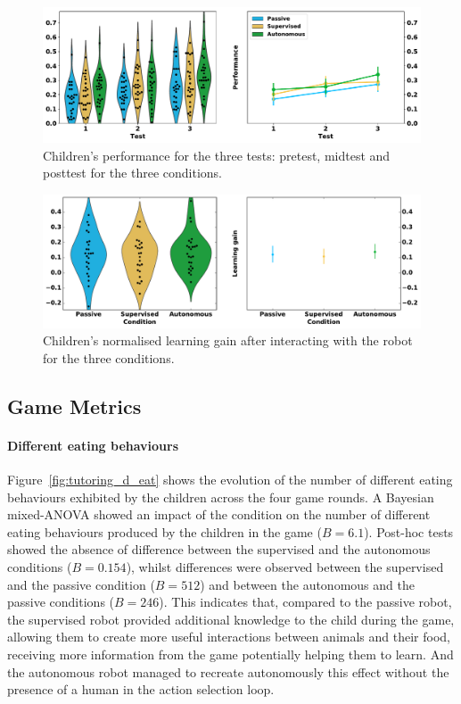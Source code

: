 \begin{figure}[ht]
	\includegraphics[width=1\linewidth]{perf.pdf}
	\centering
	\caption{Children's performance for the three tests: pretest, midtest and posttest for the three conditions.}
	\label{fig:tutoring_performance}
\end{figure}

\begin{figure}[ht]
	\includegraphics[width=1\linewidth]{learning.pdf}
	\centering
	\caption{Children's normalised learning gain after interacting with the robot for the three conditions.}
	\label{fig:tutoring_learning}
\end{figure}

\subsection{Game Metrics}

\paragraph{Different eating behaviours}
Figure~\ref{fig:tutoring_d_eat} shows the evolution of the number of different eating behaviours exhibited by the children across the four game rounds. A Bayesian mixed-ANOVA showed an impact of the condition on the number of different eating behaviours produced by the children in the game ($B=6.1$). Post-hoc tests showed the absence of difference between the supervised and the autonomous conditions ($B=0.154$), whilst differences were observed between the supervised and the passive condition ($B=512$) and between the autonomous and the passive conditions ($B=246$). This indicates that, compared to the passive robot, the supervised robot provided additional knowledge to the child during the game, allowing them to create more useful interactions between animals and their food, receiving more information from the game potentially helping them to learn. And the autonomous robot managed to recreate autonomously this effect without the presence of a human in the action selection loop.


